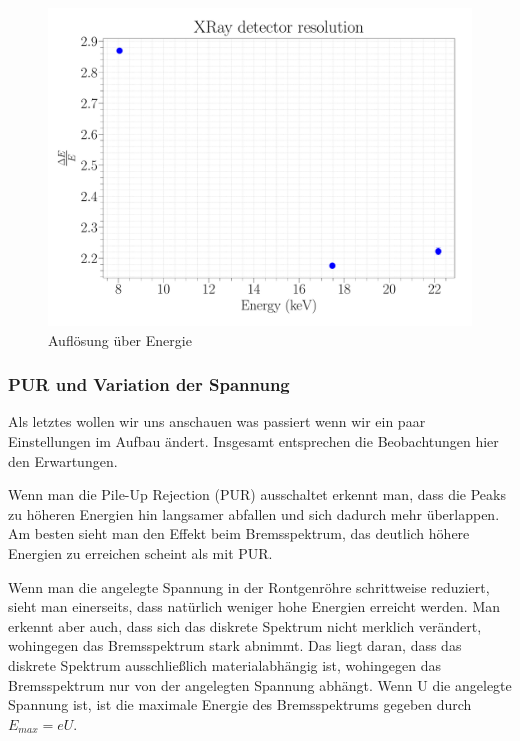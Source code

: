 \documentclass[a4paper,14pt]{article}
\begin{document}
\begin{figure}[H]
\centering
\includegraphics[width=\textwidth]{../Figures/xray_resolution.pdf}
\caption{Auflösung über Energie}
\label{XRay_resolution}
\end{figure}

\subsubsection{PUR und Variation der Spannung}
Als letztes wollen wir uns anschauen was passiert wenn wir ein paar Einstellungen im Aufbau ändert. Insgesamt entsprechen die Beobachtungen hier den Erwartungen.

Wenn man die Pile-Up Rejection (PUR) ausschaltet erkennt man, dass die Peaks zu höheren Energien hin langsamer abfallen und sich dadurch mehr überlappen. Am besten sieht man den Effekt beim Bremsspektrum, das deutlich höhere Energien zu erreichen scheint als mit PUR.

Wenn man die angelegte Spannung in der Rontgenröhre schrittweise reduziert, sieht man einerseits, dass natürlich weniger hohe Energien erreicht werden. Man erkennt aber auch, dass sich das diskrete Spektrum nicht merklich verändert, wohingegen das Bremsspektrum stark abnimmt. Das liegt daran, dass das diskrete Spektrum ausschließlich materialabhängig ist, wohingegen das Bremsspektrum nur von der angelegten Spannung abhängt. Wenn U die angelegte Spannung ist, ist die maximale Energie des Bremsspektrums gegeben durch $E_{max} = eU$.
\end{document}
